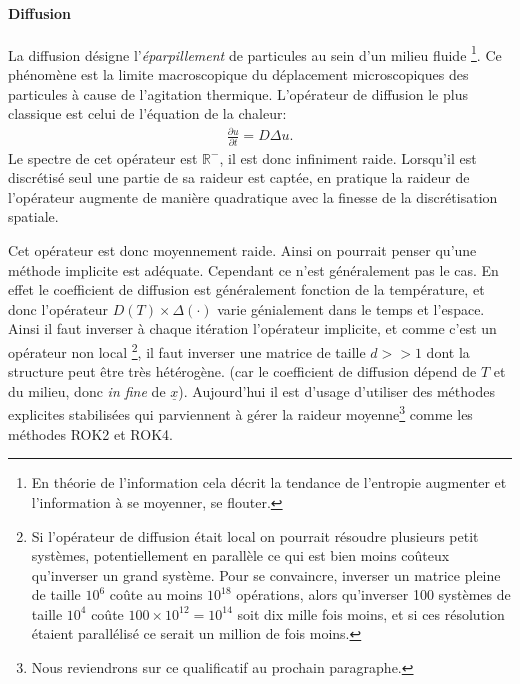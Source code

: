 \paragraph{Diffusion}
    La diffusion désigne l'\textit{éparpillement} de particules au sein d'un milieu fluide
    \footnote{En théorie de l'information cela décrit la tendance de l'entropie augmenter et l'information à se moyenner, se flouter.}.
    Ce phénomène est la limite macroscopique du déplacement microscopiques 
    des particules à cause de l'agitation thermique. L'opérateur de diffusion le plus classique est celui de l'équation de la chaleur:
    \begin{align} \frac{\partial u}{\partial t} = D \Delta u.\end{align}
    Le spectre de cet opérateur est $\mathbb R^-$, il est donc infiniment raide. Lorsqu'il est discrétisé seul une partie de sa raideur est captée,
    en pratique la raideur de l'opérateur augmente de manière quadratique avec la finesse de la discrétisation spatiale.\par
    Cet opérateur est donc moyennement raide. Ainsi on pourrait penser qu'une méthode implicite est adéquate. Cependant ce n'est généralement pas le cas.
    En effet le coefficient de diffusion est généralement fonction de la température, et donc l’opérateur $D(T) \times \Delta(\cdot)$ varie génialement dans le temps et l'espace. 
    Ainsi il faut inverser à chaque itération l'opérateur implicite, et comme c'est un opérateur non local
    \footnote{Si l'opérateur de diffusion était local on pourrait résoudre plusieurs petit systèmes, potentiellement en parallèle ce qui est bien moins coûteux qu'inverser 
    un grand système. Pour se convaincre, inverser un matrice pleine de taille $10^6$ coûte au moins $10^{18}$ opérations, alors qu'inverser 100 systèmes de taille $10^4$
    coûte $100 \times 10^{12} = 10^{14}$ soit dix mille fois moins, et si ces résolution étaient parallélisé ce serait un million de fois moins.},
    il faut inverser une matrice de taille $d >> 1$ dont la structure
    peut être très hétérogène.
    (car le coefficient de diffusion dépend de $T$ et du milieu, donc \textit{in fine} de $\underline x$). Aujourd'hui il est d'usage d'utiliser 
    des méthodes explicites stabilisées qui parviennent à gérer la raideur moyenne\footnote{Nous reviendrons sur ce qualificatif au prochain paragraphe.} comme les méthodes 
    ROK2 et ROK4\cite{abdulle2002fourth}.

